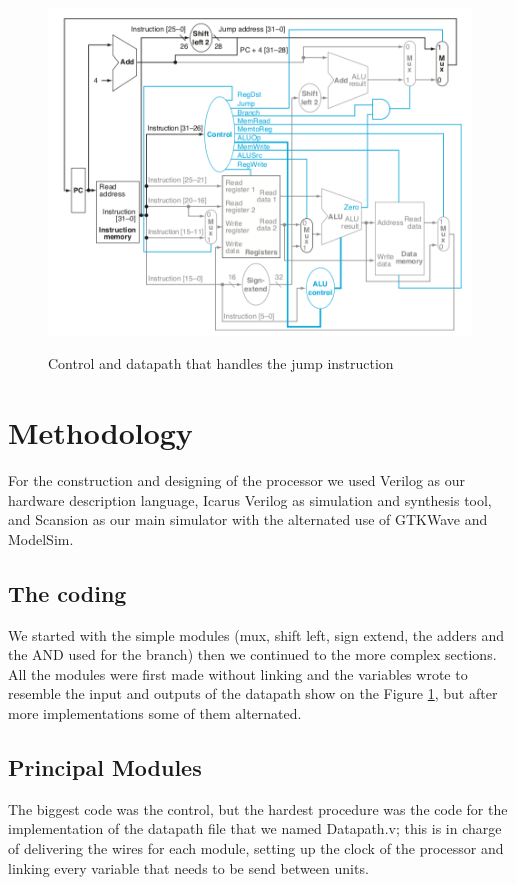 \documentclass[conference]{IEEEtran}
\begin{document}
    \begin{figure}[h]
    \caption{Control and datapath that handles the jump instruction}
    \centering
    \includegraphics[scale=0.5]{images/datapath.png}
    \label{fig:datapath}
    \end{figure}
    

\section{Methodology}
For the construction and designing of the processor we used Verilog as our hardware description language, Icarus Verilog as simulation and synthesis tool, and Scansion as our main simulator with the alternated use of GTKWave and ModelSim.
    
    \subsection{The coding}
    We started with the simple modules (mux, shift left, sign extend, the adders and the AND used for the branch)  then we continued to the more complex sections. All the modules were first made without linking and the variables wrote to resemble the input and outputs of the datapath show on the Figure \ref{fig:datapath}, but after more implementations some of them alternated.
    
    \subsection{Principal Modules}
    The biggest code was the control, but the hardest procedure was the code for the implementation of the datapath file that we named Datapath.v; this is in charge of delivering the wires for each module, setting up the clock of the processor and linking every variable that needs to be send between units.
    
\end{document}
